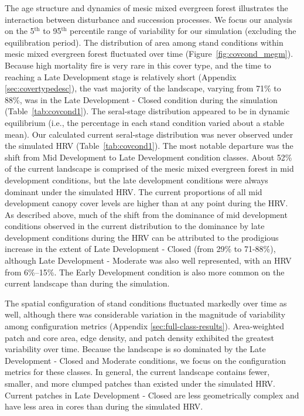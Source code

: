 The age structure and dynamics of mesic mixed evergreen forest illustrates the interaction between disturbance and succession processes. We focus our analysis on the 5$^{\text{th}}$ to 95$^{\text{th}}$ percentile range of variability for our simulation (excluding the equilibration period). %
%
The distribution of area among stand conditions within mesic mixed evergreen forest fluctuated over time (Figure~\ref{fig:covcond_megm}). Because high mortality fire is very rare in this cover type, and the time to reaching a Late Development stage is relatively short (Appendix \ref{sec:covertypedesc}), the vast majority of the landscape, varying from 71\% to 88\%, was in the Late Development - Closed condition during the simulation (Table~\ref{tab:covcond1}). %
%
The seral-stage distribution appeared to be in dynamic equilibrium (i.e., the percentage in each stand condition varied about a stable mean). Our calculated current seral-stage distribution was never observed under the simulated HRV (Table~\ref{tab:covcond1}). The most notable departure was the shift from Mid Development to Late Development condition classes. About 52\% of the current landscape is comprised of the mesic mixed evergreen forest in mid development conditions, but the late development conditions were always dominant under the simulated HRV. The current proportions of all mid development canopy cover levels are higher than at any point during the HRV. As described above, much of the shift from the dominance of mid development conditions observed in the current distribution to the dominance by late development conditions during the HRV can be attributed to the prodigious increase in the extent of Late Development - Closed (from 29\% to 71-88\%), although Late Development - Moderate was also well represented, with an HRV from 6\%--15\%. The Early Development condition is also more common on the current landscape than during the simulation.

The spatial configuration of stand conditions fluctuated markedly over time as well, although there was considerable variation in the magnitude of variability among configuration metrics (Appendix \ref{sec:full-class-results}). Area-weighted patch and core area, edge density, and patch density exhibited the greatest variability over time. Because the landscape is so dominated by the Late Development - Closed and Moderate conditions, we focus on the configuration metrics for these classes. In general, the current landscape contains fewer, smaller, and more clumped patches than existed under the simulated HRV. Current patches in Late Development - Closed are less geometrically complex and have less area in cores than during the simulated HRV.



